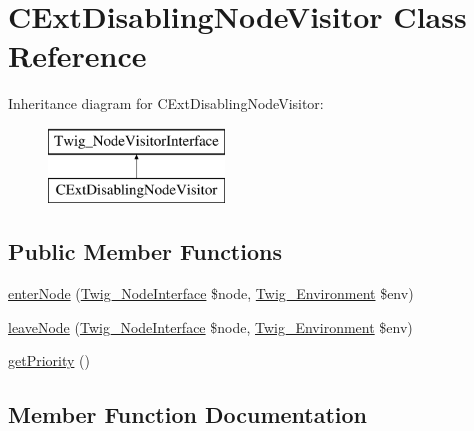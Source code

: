 \hypertarget{classCExtDisablingNodeVisitor}{}\section{C\+Ext\+Disabling\+Node\+Visitor Class Reference}
\label{classCExtDisablingNodeVisitor}
Inheritance diagram for C\+Ext\+Disabling\+Node\+Visitor\+:\begin{figure}[H]
\begin{center}
\leavevmode
\includegraphics[height=2.000000cm]{classCExtDisablingNodeVisitor}
\end{center}
\end{figure}
\subsection*{Public Member Functions}
\begin{DoxyCompactItemize}
\item 
\hyperlink{classCExtDisablingNodeVisitor_a1a3637b2dd321cd175df91cc31ab4d30}{enter\+Node} (\hyperlink{interfaceTwig__NodeInterface}{Twig\+\_\+\+Node\+Interface} \$node, \hyperlink{classTwig__Environment}{Twig\+\_\+\+Environment} \$env)
\item 
\hyperlink{classCExtDisablingNodeVisitor_a861b7a623f81fd53f0597779e3e32a09}{leave\+Node} (\hyperlink{interfaceTwig__NodeInterface}{Twig\+\_\+\+Node\+Interface} \$node, \hyperlink{classTwig__Environment}{Twig\+\_\+\+Environment} \$env)
\item 
\hyperlink{classCExtDisablingNodeVisitor_a01c692363154fa8a453812060323eaed}{get\+Priority} ()
\end{DoxyCompactItemize}


\subsection{Member Function Documentation}

